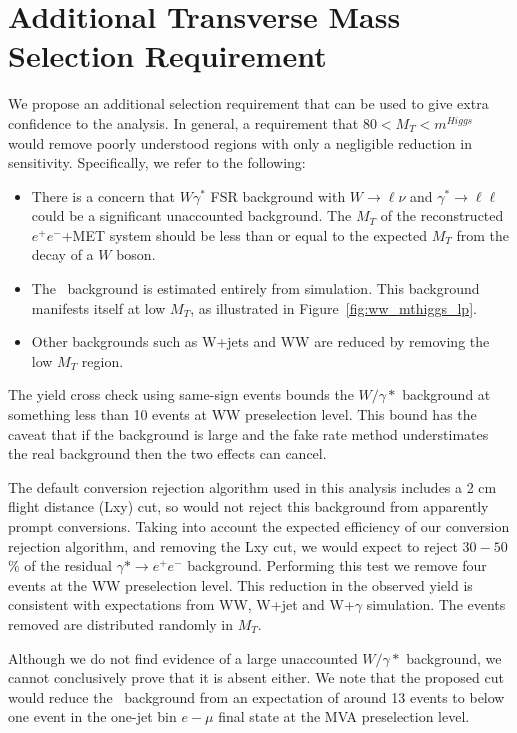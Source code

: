 \documentclass{cmspaper}
\begin{document}
\section{Additional Transverse Mass Selection Requirement}

We propose an additional selection requirement that can
be used to give extra confidence to the analysis. In general, a
requirement that $80 < M_T < m^{Higgs}$ would remove poorly understood
regions with only a negligible reduction in sensitivity.
Specifically, we refer to the following:

\begin{itemize}
    \item There is a concern that $W\gamma^*$ FSR background with
      $W\rightarrow \ell\nu$ and $\gamma^*\rightarrow\ell\ell$ could be
      a significant unaccounted background.  The $M_T$ of the
      reconstructed $e^{+}e^{-}$+MET system should be less than or
      equal to the expected $M_T$ from the decay of a $W$ boson.
    \item The \dytt~background is estimated entirely from simulation.
      This background manifests itself at low $M_T$, as illustrated in
      Figure~\ref{fig:ww_mthiggs_lp}.
    \item Other backgrounds such as W+jets and WW are reduced by
      removing the low $M_T$ region.
\end{itemize}

The yield cross check using same-sign events bounds the $W/\gamma*$ background 
at something less than 10 events at WW preselection level.  
This bound has the caveat that if the background is large and the 
fake rate method understimates the real background then the two
effects can cancel.

The default conversion rejection algorithm used in this analysis
includes a 2 cm flight distance (Lxy) cut, so would not reject this background
from apparently prompt conversions.
Taking into account the expected efficiency of our conversion
rejection algorithm, and removing the Lxy cut, 
we would expect to reject $30-50$\% of the residual 
$\gamma*\rightarrow e^{+}e^{-}$ background.
Performing this test we remove four events at the WW preselection level.
This reduction in the observed yield is consistent with expectations
from WW, W+jet and W+$\gamma$ simulation.
The events removed are distributed randomly in $M_T$.

Although we do not find evidence of a large unaccounted $W/\gamma*$ background,
we cannot conclusively prove that it is absent either.
We note that the proposed cut would reduce the \dytt~background from an expectation
of around 13 events to below one event in the one-jet bin $e-\mu$ final state at
the MVA preselection level.
\end{document}
